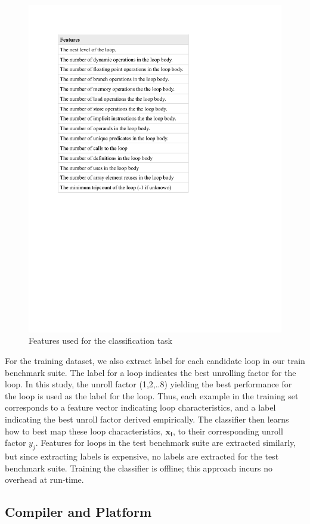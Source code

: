 \documentclass[]{sig-alternate}
\begin{document}
\begin{figure}
  \center
  \includegraphics[width=0.90\linewidth]{fig/features.pdf}
  \caption{Features used for the classification task}
  \label{fig:features}
\end{figure}

For the training dataset, we also extract label for each candidate loop in our train benchmark suite. The label for a loop indicates the best unrolling factor for the loop. In this study, the unroll factor (1,2,..8) yielding the best performance for the loop is used as the label for the loop. Thus, each example in the training set corresponds to a feature vector indicating loop characteristics, and a label indicating the best unroll factor derived empirically. The classifier then learns how to best map these loop characteristics, $\mathbf{x_i}$, to their corresponding unroll factor $y_j$. Features for loops in the test benchmark suite are extracted similarly, but since extracting labels is expensive, no labels are extracted for the test benchmark suite. Training the classifier is offline; this approach incurs no overhead at run-time. 

\subsection{Compiler and Platform}
\label{subsec:CompilerPlatform}
\end{document}
